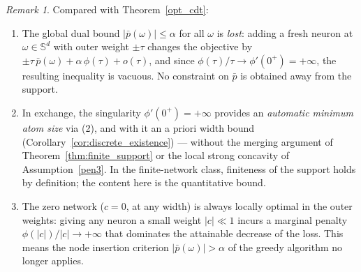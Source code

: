 \documentclass[11pt]{amsart}
\theoremstyle{definition}
\theoremstyle{remark}
\newtheorem{remark}[theorem]{Remark}
\begin{document}
\begin{remark}
Compared with Theorem~\ref{opt_cdt}:
\begin{enumerate}
	\item The global dual bound $|\bar{p}(\omega)| \le \alpha$ for all
	$\omega$ is \emph{lost}: adding a fresh neuron at $\omega \in \mathbb{S}^d$
	with outer weight $\pm\tau$ changes the objective by
	$\pm\tau\,\bar{p}(\omega) + \alpha\,\phi(\tau) + o(\tau)$, and since
	$\phi(\tau)/\tau \to \phi'(0^+) = +\infty$, the resulting inequality is
	vacuous. No constraint on $\bar{p}$ is obtained away from the support.
	\item In exchange, the singularity $\phi'(0^+) = +\infty$ provides an
	\emph{automatic minimum atom size} via (2), and with it an a priori width
	bound (Corollary~\ref{cor:discrete_existence}) --- without the merging
	argument of Theorem~\ref{thm:finite_support} or the local strong concavity
	of Assumption~\ref{pen3}. In the finite-network class, finiteness of the
	support holds by definition; the content here is the quantitative bound.
	\item The zero network ($c = 0$, at any width) is always locally optimal
	in the outer weights: giving any neuron a small weight $|c| \ll 1$ incurs
	a marginal penalty $\phi(|c|)/|c| \to +\infty$ that dominates the
	attainable decrease of the loss.
	This means the node insertion criterion $|\bar{p}(\omega)| > \alpha$
	of the greedy algorithm no longer applies.
\end{enumerate}
\end{remark}
\end{document}
